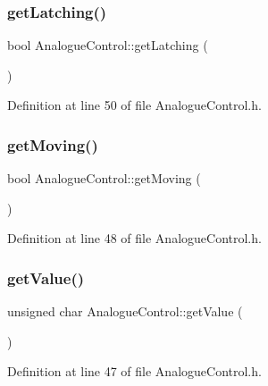 \subsubsection{\texorpdfstring{get\+Latching()}{getLatching()}}
{\footnotesize\ttfamily bool Analogue\+Control\+::get\+Latching (\begin{DoxyParamCaption}{ }\end{DoxyParamCaption})\hspace{0.3cm}{\ttfamily [inline]}}



Definition at line 50 of file Analogue\+Control.\+h.

\mbox{\label{class_analogue_control_a1c2b0439a77656ce62ddc69ee851cb86}} 
\subsubsection{\texorpdfstring{get\+Moving()}{getMoving()}}
{\footnotesize\ttfamily bool Analogue\+Control\+::get\+Moving (\begin{DoxyParamCaption}{ }\end{DoxyParamCaption})\hspace{0.3cm}{\ttfamily [inline]}}



Definition at line 48 of file Analogue\+Control.\+h.

\mbox{\label{class_analogue_control_ad92cad38f19cedae45aeeab748ddb455}} 
\subsubsection{\texorpdfstring{get\+Value()}{getValue()}}
{\footnotesize\ttfamily unsigned char Analogue\+Control\+::get\+Value (\begin{DoxyParamCaption}{ }\end{DoxyParamCaption})\hspace{0.3cm}{\ttfamily [inline]}}



Definition at line 47 of file Analogue\+Control.\+h.

\mbox{\label{class_analogue_control_ab670265f948d7416bcf07c91dcf97bce}} 
